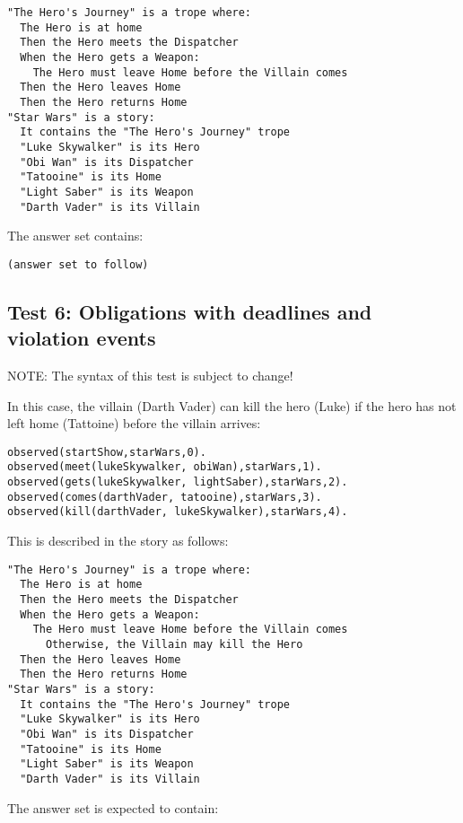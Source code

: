\documentclass[11pt]{article}
\begin{document}
\begin{verbatim}
"The Hero's Journey" is a trope where:
  The Hero is at home
  Then the Hero meets the Dispatcher
  When the Hero gets a Weapon:
    The Hero must leave Home before the Villain comes
  Then the Hero leaves Home
  Then the Hero returns Home
"Star Wars" is a story:
  It contains the "The Hero's Journey" trope
  "Luke Skywalker" is its Hero
  "Obi Wan" is its Dispatcher
  "Tatooine" is its Home
  "Light Saber" is its Weapon
  "Darth Vader" is its Villain
\end{verbatim}

The answer set contains:

\begin{verbatim}
(answer set to follow)
\end{verbatim}

\subsection{Test 6: Obligations with deadlines and violation events}
\label{sec:orgheadline7}

NOTE: The syntax of this test is subject to change!

In this case, the villain (Darth Vader) can kill the hero (Luke) if the hero has not left home (Tattoine) before the villain arrives:

\begin{verbatim}
observed(startShow,starWars,0).
observed(meet(lukeSkywalker, obiWan),starWars,1).
observed(gets(lukeSkywalker, lightSaber),starWars,2).
observed(comes(darthVader, tatooine),starWars,3).
observed(kill(darthVader, lukeSkywalker),starWars,4).
\end{verbatim}

This is described in the story as follows:

\begin{verbatim}
"The Hero's Journey" is a trope where:
  The Hero is at home
  Then the Hero meets the Dispatcher
  When the Hero gets a Weapon:
    The Hero must leave Home before the Villain comes
      Otherwise, the Villain may kill the Hero
  Then the Hero leaves Home
  Then the Hero returns Home
"Star Wars" is a story:
  It contains the "The Hero's Journey" trope
  "Luke Skywalker" is its Hero
  "Obi Wan" is its Dispatcher
  "Tatooine" is its Home
  "Light Saber" is its Weapon
  "Darth Vader" is its Villain
\end{verbatim}

The answer set is expected to contain:
\end{document}
